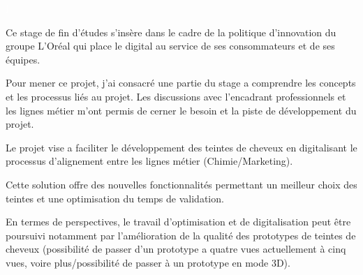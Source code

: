 \textcolor{white}{I} %

\begin{center}

\end{center}
Ce stage de fin d'études s'insère dans le cadre de la politique d'innovation du groupe L'Oréal qui place le digital au service de ses consommateurs et de ses équipes.

Pour mener ce projet, j’ai consacré une partie du stage a comprendre les concepts et les processus liés au projet. Les discussions avec l’encadrant professionnels et les lignes métier m’ont permis de cerner le besoin et la piste de développement du projet.

Le projet vise a faciliter le développement des teintes de cheveux en digitalisant le processus d'alignement entre les lignes métier (Chimie/Marketing).

Cette solution offre des nouvelles fonctionnalités permettant un meilleur choix des teintes et une optimisation du temps de validation.

En termes de perspectives, le travail d’optimisation et de digitalisation peut être poursuivi notamment par l’amélioration de la qualité des prototypes de teintes de cheveux (possibilité de passer d’un prototype a quatre vues actuellement à cinq vues, voire plus/possibilité de passer à un prototype en mode 3D).


